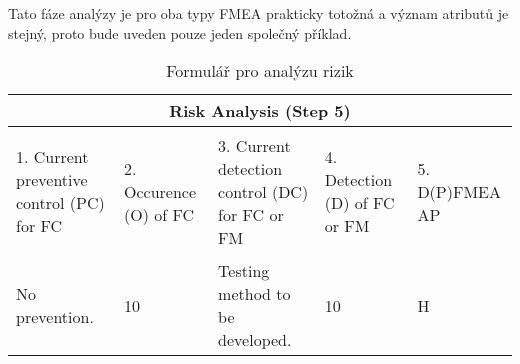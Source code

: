 Tato fáze analýzy je pro oba typy FMEA prakticky totožná a význam atributů je stejný, proto bude uveden pouze jeden společný příklad.

\begin{center}
\begin{table}[h]
	\centering
	\caption{Formulář pro analýzu rizik }
	\label{tab:risk_FMEA}
\begin{tabular}{|p{4cm}|p{0.5cm}|p{4cm}|p{0.5cm}|p{0.5cm}|  }
 \hline
 \multicolumn{5}{|c|}{Risk Analysis (Step 5)} \\
 \hline
1. Current preventive control (PC) for FC
&
  \begin{turn}{-90}2. Occurence (O) of FC\end{turn} &
3. Current detection control (DC) for FC or FM
 &
  \begin{turn}{-90}4. Detection (D) of FC or FM\end{turn}
 &
  \begin{turn}{-90}5. D(P)FMEA AP\end{turn}

\\
 \hline
No prevention.
& 10
& Testing method to be developed.
& 10
& H


\\
 \hline
\end{tabular}\  
\end{table}
\end{center}


